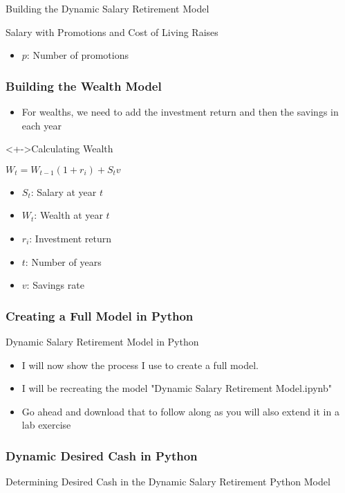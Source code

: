 \documentclass[handout, 11pt]{beamer}
\begin{document}
\begin{section}{Building the Dynamic Salary Retirement Model}
\begin{frame}
\begin{block}{Salary with Promotions and Cost of Living Raises}
\begin{itemize}
\item $p$:  Number of promotions
\end{itemize}
\end{block}
\end{frame}
\begin{frame}
\frametitle{Building the Wealth Model}
\begin{itemize}[<+->]
\item For wealths, we need to add the investment return and then the savings in each year
\end{itemize}
\vfill
\begin{block}<+->{Calculating Wealth}
\begin{center}
\begin{adjustbox}{width=0.9\textwidth, height=0.8\textheight, keepaspectratio}
$W_t = W_{t-1}  (1 + r_i) + S_t  v$
\end{adjustbox}
\end{center}
\begin{itemize}
\item $S_t$:  Salary at year $t$
\item $W_t$:  Wealth at year $t$
\item $r_i$:  Investment return
\item $t$:  Number of years
\item $v$:  Savings rate
\end{itemize}
\end{block}
\end{frame}
\begin{frame}
\frametitle{Creating a Full Model in Python}
{
\begin{block}{Dynamic Salary Retirement Model in Python}
\begin{itemize}
\item I will now show the process I use to create a full model.
\item I will be recreating the model "Dynamic Salary Retirement Model.ipynb"
\item Go ahead and download that to follow along as you will also extend it in a lab exercise
\end{itemize}
\end{block}
}
\end{frame}
\begin{frame}
\frametitle{Dynamic Desired Cash in Python}
{
\begin{block}{Determining Desired Cash in the Dynamic Salary Retirement Python Model}

\end{block}}
\end{frame}
\end{section}
\end{document}
